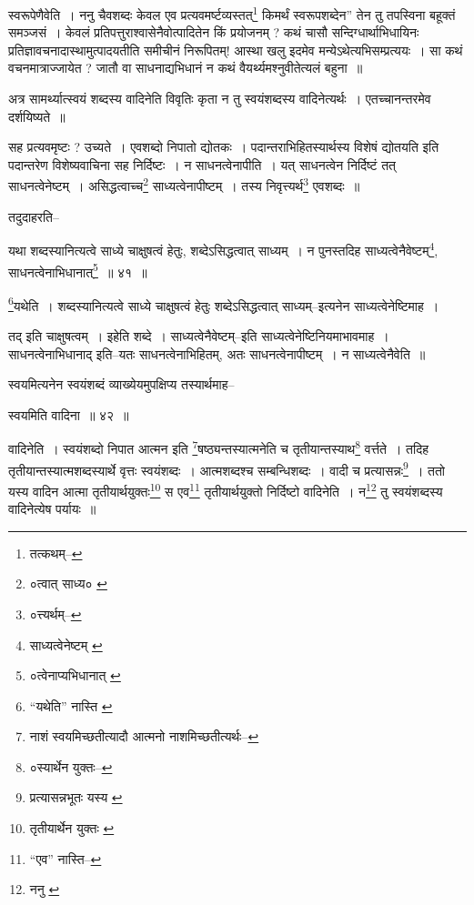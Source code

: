 \documentclass[article,12pt,a4paper]{memoir}
\begin{document}
	स्वरूपेणैवेति । ननु चैवशब्दः केवल एव प्रत्यवमर्ष्टव्यस्तत्\footnote{तत्कथम्--\cite{dp-msB}} किमर्थं स्वरूपशब्देन” तेन तु तपस्विना बहूक्तं समञ्जसं । केवलं प्रतिपत्तुराश्वासेनैवोत्पादितेन किं प्रयोजनम् ? कथं चासौ सन्दिग्धार्थाभिधायिनः प्रतिज्ञावचनादास्थामुत्पादयतीति समीचीनं निरूपितम्! आस्था खलु इदमेव मन्येऽथेत्यभिसम्प्रत्ययः । सा कथं वचनमात्राज्जायेत ? जातौ वा साधनाद्यभिधानं न कथं वैयर्थ्यमश्नुवीतेत्यलं बहुना ॥
	\pend
      

	  \pstart अत्र सामर्थ्यात्स्वयं शब्दस्य वादिनेति विवृतिः कृता न तु स्वयंशब्दस्य वादिनेत्यर्थः । एतच्चानन्तरमेव दर्शयिष्यते ॥
	\pend
      \leavevmode{}
	  \bigskip
	  \begingroup
	

	  \pstart सह प्रत्यवमृष्टः ? उच्यते । एवशब्दो निपातो द्योतकः । पदान्तराभिहितस्यार्थस्य विशेषं द्योतयति इति पदान्तरेण विशेष्यवाचिना सह निर्दिष्टः । न साधनत्वेनापीति । यत् साधनत्वेन निर्दिष्टं तत् साधनत्वेनेष्टम् । असिद्धत्वाच्च\footnote{०त्वात् साध्य० \cite{dp-msB}} साध्यत्वेनापीष्टम् । तस्य निवृत्त्यर्थ\footnote{०त्त्यर्थम्--\cite{dp-msD}} एवशब्दः ॥
	\pend
       

	  \pstart तदुदाहरति--
	\pend
       
	  \bigskip
	  \begingroup
	

	  \pstart यथा शब्दस्यानित्यत्वे साध्ये चाक्षुषत्वं हेतुः, शब्देऽसिद्धत्वात् साध्यम् । न पुनस्तदिह साध्यत्वेनैवेष्टम्\footnote{साध्यत्वेनेष्टम् \cite{dp-msC} \cite{dp-msD} \cite{dp-edE}}, साधनत्वेनाभिधानात्\footnote{०त्वेनाप्यभिधानात् \cite{dp-msB} \cite{dp-edP} \cite{dp-edH} \cite{dp-edE} \cite{dp-edN}} ॥ ४१ ॥
	\pend
      
	  \endgroup
	 

	  \pstart \footnote{“यथेति” नास्ति \cite{dp-msA}}यथेति । शब्दस्यानित्यत्वे साध्ये चाक्षुषत्वं हेतुः शब्देऽसिद्धत्वात् साध्यम्--इत्यनेन साध्यत्वेनेष्टिमाह ।
	\pend
       

	  \pstart तद् इति चाक्षुषत्वम् । इहेति शब्दे । साध्यत्वेनैवेष्टम्--इति साध्यत्वेनेष्टिनियमाभावमाह । साधनत्वेनाभिधानाद् इति--यतः साधनत्वेनाभिहितम्, अतः साधनत्वेनापीष्टम् । न साध्यत्वेनैवेति ॥
	\pend
       

	  \pstart स्वयमित्यनेन स्वयंशब्दं व्याख्येयमुपक्षिप्य तस्यार्थमाह--
	\pend
       
	  \bigskip
	  \begingroup
	

	  \pstart स्वयमिति वादिना ॥ ४२ ॥
	\pend
      
	  \endgroup
	 

	  \pstart वादिनेति । स्वयंशब्दो निपात आत्मन इति \footnote{नाशं स्वयमिच्छतीत्यादौ आत्मनो नाशमिच्छतीत्यर्थः--\cite{dp-msD-n}}षष्ठ्यन्तस्यात्मनेति च तृतीयान्तस्याथ\footnote{०स्यार्थेन युक्तः--\cite{dp-msB}} वर्त्तते । तदिह तृतीयान्तस्यात्मशब्दस्यार्थे वृत्तः स्वयंशब्दः । आत्मशब्दश्च सम्बन्धिशब्दः । वादी च प्रत्यासन्नः\footnote{प्रत्यासन्नभूतः यस्य \cite{dp-msA} \cite{dp-msB} \cite{dp-edP} \cite{dp-edH}} । ततो यस्य वादिन आत्मा तृतीयार्थयुक्तः\footnote{तृतीयार्थेन युक्तः \cite{dp-msC} \cite{dp-msD}} स एव\footnote{“एव” नास्ति--\cite{dp-msB}} तृतीयार्थयुक्तो निर्दिष्टो वादिनेति । न\footnote{ननु \cite{dp-msA} \cite{dp-msB} \cite{dp-edP} \cite{dp-edH}} तु स्वयंशब्दस्य वादिनेत्येष पर्यायः ॥
	\pend
      
\end{document}
